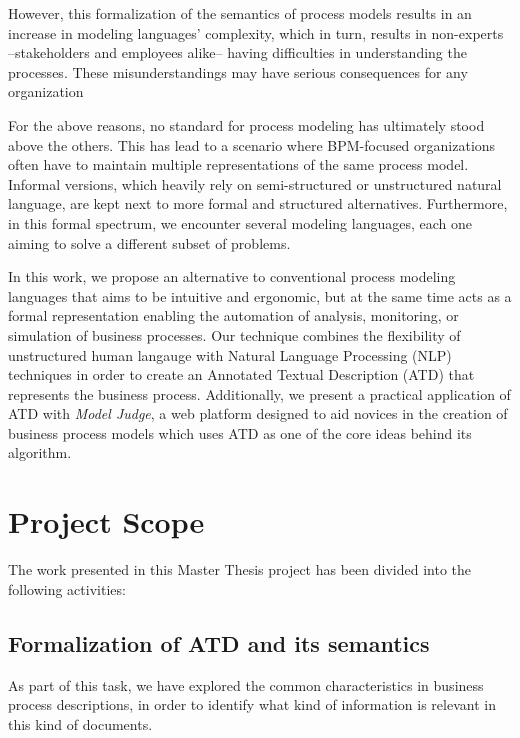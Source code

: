 However, this formalization of the semantics of process models results in an
increase in modeling languages' complexity, which in turn, results in
non-experts --stakeholders and employees alike-- having difficulties in
understanding the processes\cite{leopold2014supporting}. These misunderstandings may
have serious consequences for any organization\cite{van2015fragmentation}

For the above reasons, no standard for process modeling has ultimately stood above
the others. This has lead to a scenario where BPM-focused organizations often
have to maintain multiple representations of the same process model. Informal
versions, which heavily rely on semi-structured or unstructured natural
language, are kept next to more formal and structured alternatives. Furthermore,
in this formal spectrum, we encounter several modeling languages, each one
aiming to solve a different subset of problems\cite{10.1007/978-3-540-72035-5_7,
 van2003workflow}.

In this work, we propose an alternative to conventional process modeling
languages that aims to be intuitive and ergonomic, but at the same time acts 
as a formal representation enabling the automation of analysis, monitoring, or
simulation of business processes. Our technique combines the flexibility of
unstructured human langauge with Natural Language Processing (NLP) techniques in
order to create an Annotated Textual Description (ATD) that represents the
business process. Additionally, we present a practical application of ATD with
\emph{Model Judge}, a web platform designed to aid novices in the creation of
business process models which uses ATD as one of the core ideas behind its
algorithm.

\section{Project Scope}
\label{sec:scope}

The work presented in this Master Thesis project has been divided into the
following activities:

\subsection*{Formalization of ATD and its semantics}

As part of this task, we have explored the common characteristics in business
process descriptions, in order to identify what kind of information is relevant
in this kind of documents.


